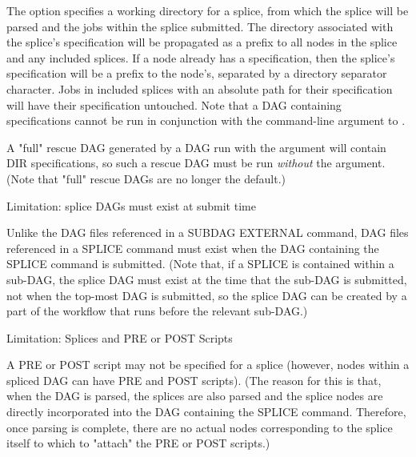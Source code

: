 The  option specifies a working directory for a splice,
from which the splice will be parsed and the jobs within the splice submitted.
The directory associated with the splice's  specification
will be propagated as a prefix to all nodes in the splice and any 
included splices.
If a node already has a  specification, then the splice's
 specification will be a prefix to the node's, separated by
a directory separator character.
Jobs in included splices with an absolute path for their 
specification will have their  specification untouched.
Note that a DAG containing  specifications cannot be run
in conjunction with the  command-line argument to
.

A "full" rescue DAG generated by a DAG run with the  argument
will contain DIR specifications, so such a rescue DAG must be run
\emph{without} the  argument.  (Note that "full"
rescue DAGs are no longer the default.)


\begin{description}
\item[Limitation: splice DAGs must exist at submit time]
\end{description}
Unlike the DAG files referenced in a SUBDAG EXTERNAL command, DAG files
referenced in a SPLICE command must exist when the DAG containing the
SPLICE command is submitted.  (Note that, if a SPLICE is contained
within a sub-DAG, the splice DAG must exist at the time that the
sub-DAG is submitted, not when the top-most DAG is submitted, so the
splice DAG can be created by a part of the workflow that runs before
the relevant sub-DAG.)

\begin{description}
\item[Limitation: Splices and PRE or POST Scripts]
\end{description}

A PRE or POST script may not be specified for a splice (however, nodes
within a spliced DAG can have PRE and POST scripts).
(The reason for this is that, when the DAG is parsed, the splices
are also parsed and the splice nodes are directly incorporated into
the DAG containing the SPLICE command.  Therefore, once parsing is
complete, there are no actual nodes corresponding to the splice
itself to which to "attach" the PRE or POST scripts.)

